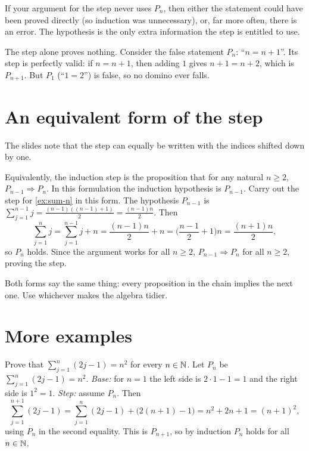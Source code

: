 \begin{warning}
If your argument for the step never uses $P_n$, then either the statement could have been proved directly (so
induction was unnecessary), or, far more often, there is an error. The hypothesis is the only extra information the
step is entitled to use.
\end{warning}

\begin{warning}
The step alone proves nothing. Consider the false statement $P_n$: ``$n=n+1$''. Its step is perfectly valid: if
$n=n+1$, then adding $1$ gives $n+1=n+2$, which is $P_{n+1}$. But $P_1$ (``$1=2$'') is false, so no domino ever falls.
\end{warning}

\section{An equivalent form of the step}\label{sec:ind-alt-step}

The slides note that the step can equally be written with the indices shifted down by one.

\begin{example}
Equivalently, the induction step is the proposition that for any natural $n\ge2$, $P_{n-1}\Rightarrow P_n$. In this
formulation the induction hypothesis is $P_{n-1}$. Carry out the step for \cref{ex:sum-n} in this form.
\solution
The hypothesis $P_{n-1}$ is $\sum_{j=1}^{n-1}j=\frac{(n-1)((n-1)+1)}2=\frac{(n-1)n}2$. Then
\[
\sum_{j=1}^{n}j=\sum_{j=1}^{n-1}j+n=\frac{(n-1)n}{2}+n=\Big(\frac{n-1}{2}+1\Big)n=\frac{(n+1)n}{2},
\]
so $P_n$ holds. Since the argument works for all $n\ge2$, $P_{n-1}\Rightarrow P_n$ for all $n\ge 2$, proving the step.
\end{example}

Both forms say the same thing: every proposition in the chain implies the next one. Use whichever makes the algebra
tidier.

\section{More examples}\label{sec:ind-more}

\begin{example}
Prove that $\sum_{j=1}^{n}(2j-1)=n^2$ for every $n\in\mathbb{N}$.
\solution
Let $P_n$ be $\sum_{j=1}^n(2j-1)=n^2$.
\emph{Base:} for $n=1$ the left side is $2\cdot1-1=1$ and the right side is $1^2=1$.
\emph{Step:} assume $P_n$. Then
\[
\sum_{j=1}^{n+1}(2j-1)=\sum_{j=1}^{n}(2j-1)+\big(2(n+1)-1\big)=n^2+2n+1=(n+1)^2,
\]
using $P_n$ in the second equality. This is $P_{n+1}$, so by induction $P_n$ holds for all $n\in\mathbb{N}$.
\end{example}

